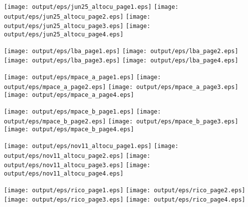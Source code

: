 \documentclass[11pt]{article}
\begin{document}
\begin{center}

\texttt{[image: output/eps/jun25\_altocu\_page1.eps]}
\texttt{[image: output/eps/jun25\_altocu\_page2.eps]}
\texttt{[image: output/eps/jun25\_altocu\_page3.eps]}
\texttt{[image: output/eps/jun25\_altocu\_page4.eps]}
\end{center}
\newpage

\begin{center}

\texttt{[image: output/eps/lba\_page1.eps]}
\texttt{[image: output/eps/lba\_page2.eps]}
\texttt{[image: output/eps/lba\_page3.eps]}
\texttt{[image: output/eps/lba\_page4.eps]}
\end{center}
\newpage

\begin{center}

\texttt{[image: output/eps/mpace\_a\_page1.eps]}
\texttt{[image: output/eps/mpace\_a\_page2.eps]}
\texttt{[image: output/eps/mpace\_a\_page3.eps]}
\texttt{[image: output/eps/mpace\_a\_page4.eps]}
\end{center}
\newpage

\begin{center}

\texttt{[image: output/eps/mpace\_b\_page1.eps]}
\texttt{[image: output/eps/mpace\_b\_page2.eps]}
\texttt{[image: output/eps/mpace\_b\_page3.eps]}
\texttt{[image: output/eps/mpace\_b\_page4.eps]}
\end{center}
\newpage

\begin{center}

\texttt{[image: output/eps/nov11\_altocu\_page1.eps]}
\texttt{[image: output/eps/nov11\_altocu\_page2.eps]}
\texttt{[image: output/eps/nov11\_altocu\_page3.eps]}
\texttt{[image: output/eps/nov11\_altocu\_page4.eps]}
\end{center}
\newpage

\begin{center}

\texttt{[image: output/eps/rico\_page1.eps]}
\texttt{[image: output/eps/rico\_page2.eps]}
\texttt{[image: output/eps/rico\_page3.eps]}
\texttt{[image: output/eps/rico\_page4.eps]}
\end{center}
\newpage
\end{document}
